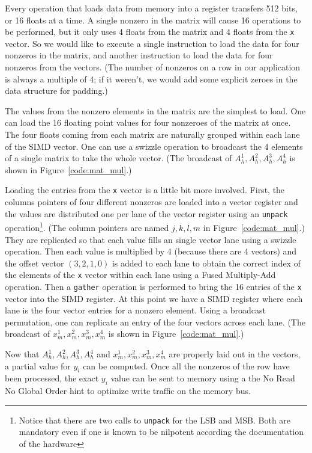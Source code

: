 \documentclass[10pt,conference,compsocconf]{IEEEtran}
\begin{document}
Every operation that loads data from memory into a register
transfers 512 bits, or 16 floats at a time. A single nonzero
in the matrix will cause 16 operations to be performed, but it only
uses 4 floats from the matrix and 4 floats from the {\tt x} vector. So
we would like to execute a single instruction to load the data for four 
nonzeros in the matrix, and another instruction to load the data for
four nonzeros from the vectors.  
(The number of nonzeros on a row in our application is
always a multiple of 4; if it weren't, we would add some explicit
zeroes in the data structure for padding.)

The values from the nonzero elements in the matrix are the simplest to
load. One can load the 16 floating point values for four nonzeroes of
the matrix at once. The four floats coming from each matrix are
naturally grouped within each lane of the SIMD vector. One can use a
swizzle operation to broadcast the 4 elements of a single matrix to
take the whole vector. (The broadcast of $A_h^1,A_h^2,A_h^3,A_h^4$ is
shown in Figure~\ref{code:mat_mul}.)

Loading the entries from the {\tt x} vector is a little bit more
involved. First, the columns pointers of four different nonzeros are
loaded into a vector register and the values are distributed one per
lane of the vector register using an {\tt unpack}
operation\footnote{Notice that there are two calls to {\tt unpack} for the
  LSB and MSB. Both are mandatory even if one is known to be
  nilpotent according the documentation of the hardware}. (The column
pointers are named $j,k,l,m$ in Figure~\ref{code:mat_mul}.) They
are replicated so that each value fills an single vector lane 
using a swizzle operation. Then each value is multiplied by 4 
(because there are 4 vectors) 
and the offset vector $(3,2,1,0)$ is added to each lane to obtain the
correct index of the elements of the {\tt x} vector within each lane
using a Fused Multiply-Add operation. Then a {\tt gather} operation is
performed to bring the 16 entries of the {\tt x} vector into the SIMD
register. At this point we have a SIMD register where each lane is the
four vector entries for a nonzero element. Using a broadcast
permutation, one can replicate an entry of the four vectors across
each lane. (The broadcast of $x_m^1,x_m^2,x_m^3,x_m^4$ is shown in
Figure~\ref{code:mat_mul}.)

Now that $A_h^1,A_h^2,A_h^3,A_h^4$ and $x_m^1,x_m^2,x_m^3,x_m^4$ are
properly laid out in the vectors, a partial value for $y_i$ can be
computed. Once all the nonzeros of the row have been processed, the
exact $y_i$ value can be sent to memory using a the No Read No Global
Order hint to optimize write traffic on the memory bus.
\end{document}

